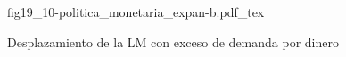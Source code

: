 \begin{figure}[h]
\centering
\def\svgwidth{0.5\textwidth}
{fig19_10-politica_monetaria_expan-b.pdf_tex}
\caption{Desplazamiento de la LM con exceso de demanda por dinero}
\label{fig19_10-politica_monetaria_expan-b}
\end{figure}